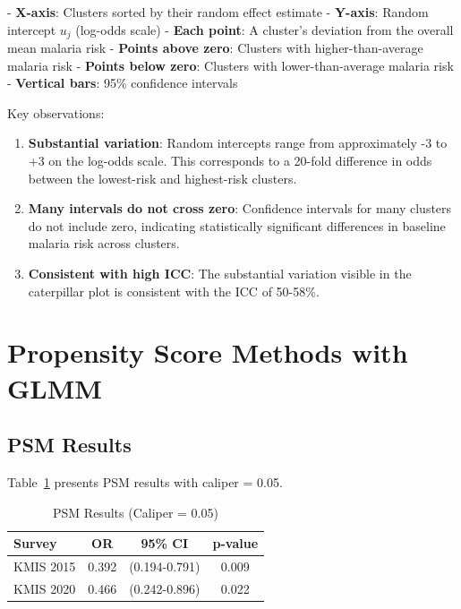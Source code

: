 - \textbf{X-axis}: Clusters sorted by their random effect estimate
- \textbf{Y-axis}: Random intercept $u_j$ (log-odds scale)
- \textbf{Each point}: A cluster's deviation from the overall mean malaria risk
- \textbf{Points above zero}: Clusters with higher-than-average malaria risk
- \textbf{Points below zero}: Clusters with lower-than-average malaria risk
- \textbf{Vertical bars}: 95\% confidence intervals

Key observations:

\begin{enumerate}
	\item \textbf{Substantial variation}: Random intercepts range from approximately -3 to +3 on the log-odds scale. This corresponds to a 20-fold difference in odds between the lowest-risk and highest-risk clusters.
	
	\item \textbf{Many intervals do not cross zero}: Confidence intervals for many clusters do not include zero, indicating statistically significant differences in baseline malaria risk across clusters.
	
	\item \textbf{Consistent with high ICC}: The substantial variation visible in the caterpillar plot is consistent with the ICC of 50-58\%.
\end{enumerate}

\section{Propensity Score Methods with GLMM}

\subsection{PSM Results}

Table~\ref{tab:psm_ch4} presents PSM results with caliper = 0.05.

\begin{table}[htbp]
	\centering
	\caption{PSM Results (Caliper = 0.05)}
	\label{tab:psm_ch4}
	\begin{tabular}{@{}lccc@{}}
		\toprule
		\textbf{Survey} & \textbf{OR} & \textbf{95\% CI} & \textbf{p-value} \\
		\midrule
		KMIS 2015 & 0.392 & (0.194-0.791) & 0.009 \\
		KMIS 2020 & 0.466 & (0.242-0.896) & 0.022 \\
		\bottomrule
	\end{tabular}
\end{table}

